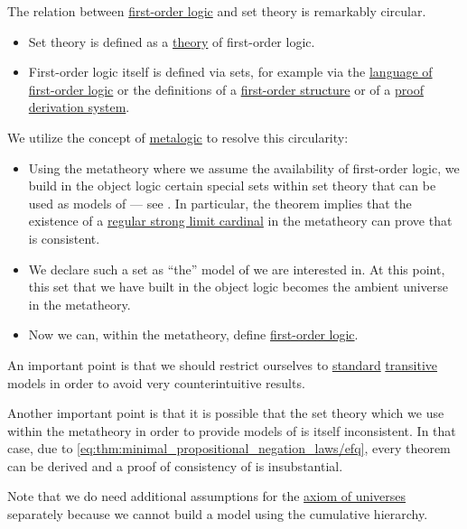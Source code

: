 \begin{remark}\label{rem:set_definition_recursion}
  The relation between \hyperref[subsec:first_order_logic]{first-order logic} and set theory is remarkably circular.

  \begin{itemize}
    \item Set theory is defined as a \hyperref[def:first_order_theory]{theory} of first-order logic.

    \item First-order logic itself is defined via sets, for example via the \hyperref[def:first_order_language]{language of first-order logic} or the definitions of a \hyperref[def:first_order_structure]{first-order structure} or of a \hyperref[def:proof_derivation_system]{proof derivation system}.
  \end{itemize}

  We utilize the concept of \hyperref[rem:metalogic]{metalogic} to resolve this circularity:
  \begin{itemize}
    \item Using the metatheory where we assume the availability of first-order logic, we build in the object logic certain special sets within set theory that can be used as models of  --- see . In particular, the theorem implies that the existence of a \hyperref[rem:strongly_inaccessible_cardinal]{regular strong limit cardinal} in the metatheory can prove that  is consistent.

    \item We declare such a set as \enquote{the} model of  we are interested in. At this point, this set that we have built in the object logic becomes the ambient universe in the metatheory.

    \item Now we can, within the metatheory, define \hyperref[subsec:first_order_logic]{first-order logic}.
  \end{itemize}

  An important point is that we should restrict ourselves to \hyperref[rem:standard_model_of_set_theory]{standard} \hyperref[rem:transitive_model_of_set_theory]{transitive} models in order to avoid very counterintuitive results.

  Another important point is that it is possible that the set theory which we use within the metatheory in order to provide models of  is itself inconsistent. In that case, due to \eqref{eq:thm:minimal_propositional_negation_laws/efq}, every theorem can be derived and a proof of consistency of  is insubstantial.

  Note that we do need additional assumptions for the \hyperref[def:axiom_of_universes]{axiom of universes} separately because we cannot build a model using the cumulative hierarchy.
\end{remark}

